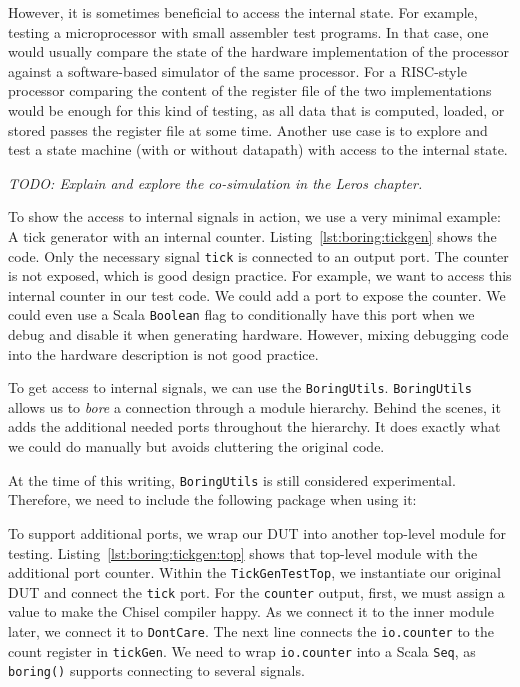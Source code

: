 \documentclass[%
    10pt,
    headinclude, footexclude,
    openright, %
    notitlepage,
    cleardoubleempty,
    headsepline,
    pointlessnumbers,
    bibtotoc, idxtotoc,
    ]{scrbook}
\newcommand{\code}[1]{{\lstinline[basicstyle=\small\ttfamily]{#1}}}
\newcommand{\todo}[1]{{\emph{TODO: #1}}}
\begin{document}
However, it is sometimes beneficial to access the internal state. For example,
testing a microprocessor with small assembler test programs.
In that case, one would usually compare the state of the hardware implementation of
the processor against a software-based simulator of the same processor.
For a RISC-style processor comparing the content of the register file of the two implementations
would be enough for this kind of testing, as all data that is computed, loaded,
or stored passes the register file at some time.
Another use case is to explore and test a state machine (with or without datapath)
with access to the internal state.


\todo{Explain and explore the co-simulation in the Leros chapter.}



To show the access to internal signals in action, we use a very minimal example:
A tick generator with an internal counter. Listing~\ref{lst:boring:tickgen} shows the code.
Only the necessary signal \code{tick} is connected to an output port.
The counter is not exposed, which is good design practice.
For example, we want to access this internal counter in our test code.
We could add a port to expose the counter. We could even use a Scala \code{Boolean}
flag to conditionally have this port when we debug and disable it
when generating hardware.
However, mixing debugging code into the hardware description is not good practice.


To get access to internal signals, we can use the \code{BoringUtils}. 
\code{BoringUtils} allows us to \emph{bore} a connection through a module hierarchy.
Behind the scenes, it adds the additional needed ports throughout the hierarchy.
It does exactly what we could do manually but avoids cluttering the original code.

At the time of this writing, \code{BoringUtils} is still considered experimental.
Therefore, we need to include the following package when using it:



To support additional ports, we wrap our DUT into another top-level module for testing.
Listing~\ref{lst:boring:tickgen:top} shows that top-level module with the additional port
counter. Within the \code{TickGenTestTop}, we instantiate our original DUT and connect
the \code{tick} port. For the \code{counter} output, first, we must assign a value to
make the Chisel compiler happy. As we connect it to the inner module later,
we connect it to \code{DontCare}.
The next line connects the \code{io.counter} to the count register in \code{tickGen}.
We need to wrap \code{io.counter} into a Scala \code{Seq}, as \code{boring()} supports
connecting to several signals.
\end{document}
